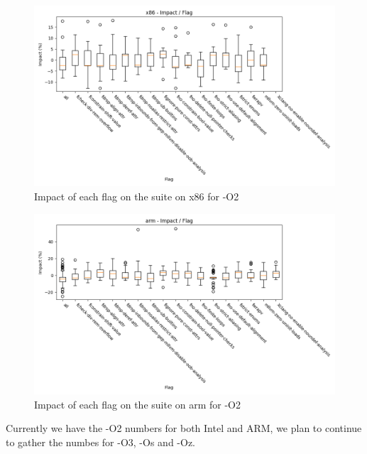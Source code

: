 \begin{figure}[H]
  \centering
  \includegraphics[scale=0.6]{x86_impact_per_flag}
  \caption{Impact of each flag on the suite on x86 for -O2}
  \label{fig:x86_impact_per_flag}
\end{figure}

\begin{figure}[H]
  \centering
  \includegraphics[scale=0.6]{arm_impact_per_flag}
  \caption{Impact of each flag on the suite on arm for -O2}
  \label{fig:arm_impact_per_flag}
\end{figure}

Currently we have the -O2 numbers for both Intel and ARM, we plan to continue to
gather the numbes for -O3, -Os and -Oz.
